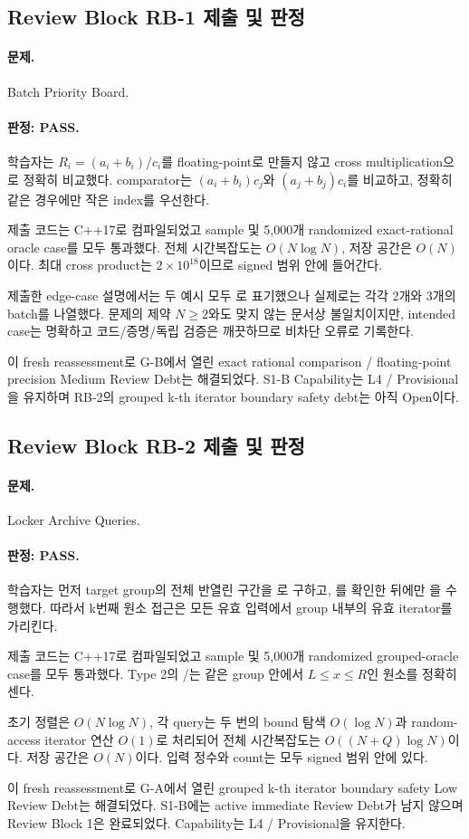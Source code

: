 \subsection{Review Block RB-1 제출 및 판정}
\paragraph{문제.} Batch Priority Board.
\paragraph{판정: PASS.} 학습자는 $R_i=(a_i+b_i)/c_i$를 floating-point로 만들지 않고 cross multiplication으로 정확히 비교했다. comparator는 $(a_i+b_i)c_j$와 $(a_j+b_j)c_i$를 비교하고, 정확히 같은 경우에만 작은 index를 우선한다.

제출 코드는 C++17로 컴파일되었고 sample 및 5,000개 randomized exact-rational oracle case를 모두 통과했다. 전체 시간복잡도는 $O(N\log N)$, 저장 공간은 $O(N)$이다. 최대 cross product는 $2\times10^{18}$이므로 signed  범위 안에 들어간다.

제출한 edge-case 설명에서는 두 예시 모두 로 표기했으나 실제로는 각각 2개와 3개의 batch를 나열했다. 문제의 제약 $N\ge2$와도 맞지 않는 문서상 불일치이지만, intended case는 명확하고 코드/증명/독립 검증은 깨끗하므로 비차단 오류로 기록한다.

이 fresh reassessment로 G-B에서 열린 exact rational comparison / floating-point precision Medium Review Debt는 해결되었다. S1-B Capability는 L4 / Provisional을 유지하며 RB-2의 grouped k-th iterator boundary safety debt는 아직 Open이다.


\subsection{Review Block RB-2 제출 및 판정}
\paragraph{문제.} Locker Archive Queries.
\paragraph{판정: PASS.} 학습자는 먼저 target group의 전체 반열린 구간을 \code{[it1,it2)}로 구하고, 를 확인한 뒤에만 을 수행했다. 따라서 k번째 원소 접근은 모든 유효 입력에서 group 내부의 유효 iterator를 가리킨다.

제출 코드는 C++17로 컴파일되었고 sample 및 5,000개 randomized grouped-oracle case를 모두 통과했다. Type 2의 /는 같은 group 안에서 $L\le x\le R$인 원소를 정확히 센다.

초기 정렬은 $O(N\log N)$, 각 query는 두 번의 bound 탐색 $O(\log N)$과 random-access iterator 연산 $O(1)$로 처리되어 전체 시간복잡도는 $O((N+Q)\log N)$이다. 저장 공간은 $O(N)$이다. 입력 정수와 count는 모두 signed  범위 안에 있다.

이 fresh reassessment로 G-A에서 열린 grouped k-th iterator boundary safety Low Review Debt는 해결되었다. S1-B에는 active immediate Review Debt가 남지 않으며 Review Block 1은 완료되었다. Capability는 L4 / Provisional을 유지한다.

